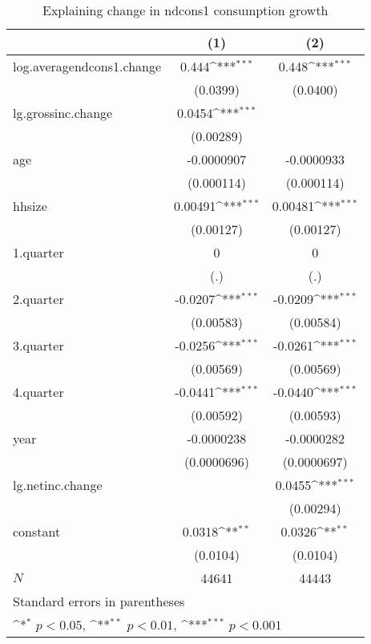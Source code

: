 \begin{table}[htbp]\centering
\def\sym#1{\ifmmode^{#1}\else\(^{#1}\)\fi}
\caption{\label{tab:logndcons1-deltacons} Explaining change in ndcons1 consumption growth}
\begin{tabular}{l*{2}{c}}
\hline\hline
            &\multicolumn{1}{c}{(1)}         &\multicolumn{1}{c}{(2)}         \\
\hline
log.averagendcons1.change&       0.444\sym{***}&       0.448\sym{***}\\
            &    (0.0399)         &    (0.0400)         \\
lg.grossinc.change&      0.0454\sym{***}&                     \\
            &   (0.00289)         &                     \\
age         &  -0.0000907         &  -0.0000933         \\
            &  (0.000114)         &  (0.000114)         \\
hhsize      &     0.00491\sym{***}&     0.00481\sym{***}\\
            &   (0.00127)         &   (0.00127)         \\
1.quarter   &           0         &           0         \\
            &         (.)         &         (.)         \\
2.quarter   &     -0.0207\sym{***}&     -0.0209\sym{***}\\
            &   (0.00583)         &   (0.00584)         \\
3.quarter   &     -0.0256\sym{***}&     -0.0261\sym{***}\\
            &   (0.00569)         &   (0.00569)         \\
4.quarter   &     -0.0441\sym{***}&     -0.0440\sym{***}\\
            &   (0.00592)         &   (0.00593)         \\
year        &  -0.0000238         &  -0.0000282         \\
            & (0.0000696)         & (0.0000697)         \\
lg.netinc.change&                     &      0.0455\sym{***}\\
            &                     &   (0.00294)         \\
constant    &      0.0318\sym{**} &      0.0326\sym{**} \\
            &    (0.0104)         &    (0.0104)         \\
\hline
\(N\)       &       44641         &       44443         \\
\hline\hline
\multicolumn{3}{l}{\footnotesize Standard errors in parentheses}\\
\multicolumn{3}{l}{\footnotesize \sym{*} \(p<0.05\), \sym{**} \(p<0.01\), \sym{***} \(p<0.001\)}\\
\end{tabular}
\end{table}
